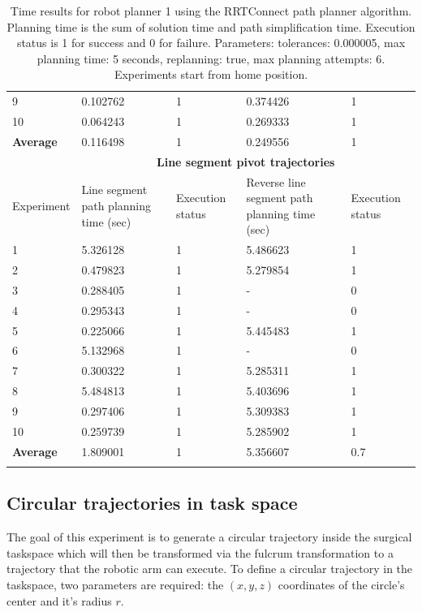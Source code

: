 \begin{longtable}{|p{}|p{}|p{}|p{}|p{}|}
9 & 0.102762 & 1 & 0.374426 & 1 \\
10 & 0.064243 & 1 & 0.269333 & 1 \\
\hline
\textbf{Average} & 0.116498 &	1 &	0.249556 &	1 \\
\hline
                          & \multicolumn{4}{c}{\textbf{Line segment pivot trajectories}}                     \vline \\
\hline
Experiment                & Line segment path planning time (sec) & Execution status & Reverse line segment path planning time (sec) & Execution status  \\
\hline
1 & 5.326128 & 1 & 5.486623 & 1 \\
2 & 0.479823 & 1 & 5.279854 & 1 \\
3 & 0.288405 & 1 & - & 0 \\
4 & 0.295343 & 1 & - & 0 \\
5 & 0.225066 & 1 & 5.445483 & 1 \\
6 & 5.132968 & 1 & - & 0 \\
7 & 0.300322 & 1 & 5.285311 & 1 \\
8 & 5.484813 & 1 & 5.403696 & 1 \\
9 & 0.297406 & 1 & 5.309383 & 1 \\
10 & 0.259739 & 1 & 5.285902 & 1 \\
\hline
\textbf{Average} & 1.809001 &	1 &	5.356607 &	0.7 \\
\hline
\caption{Time results for robot planner 1 using the RRTConnect path planner algorithm. Planning time is the sum of solution time and path simplification time. Execution status is 
1 for success and 0 for failure. Parameters: tolerances: 0.000005, max planning time: 5 seconds, replanning: true, max planning attempts: 6. Experiments start from home position.}
\label{robot-planner3b-rrtconnect-data}
\end{longtable}


\subsection{Circular trajectories in task space}

The goal of this experiment is to generate a circular trajectory inside the surgical taskspace which will then be transformed via the fulcrum transformation 
to a trajectory that the robotic arm can execute. To define a circular trajectory in the taskspace, two parameters are required: the $(x,y,z)$ coordinates of the 
circle's center and it's radius $r$.\\ 

